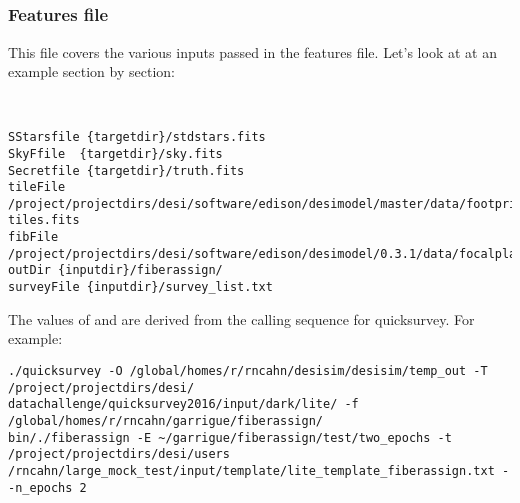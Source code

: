 \documentclass[12pt]{article}
\begin{document}
\subsection{}
\subsubsection{Features file}
This file covers the various inputs passed in the features file. 
Let's look at at an example section by section:

\begin{verbatim}


SStarsfile {targetdir}/stdstars.fits
SkyFfile  {targetdir}/sky.fits
Secretfile {targetdir}/truth.fits
tileFile /project/projectdirs/desi/software/edison/desimodel/master/data/footprint/desi-tiles.fits
fibFile /project/projectdirs/desi/software/edison/desimodel/0.3.1/data/focalplane/fiberpos.txt
outDir {inputdir}/fiberassign/
surveyFile {inputdir}/survey_list.txt
\end{verbatim}

The values of  and  are derived from the calling sequence for quicksurvey.
For example:
\begin{verbatim}
./quicksurvey -O /global/homes/r/rncahn/desisim/desisim/temp_out -T /project/projectdirs/desi/
datachallenge/quicksurvey2016/input/dark/lite/ -f /global/homes/r/rncahn/garrigue/fiberassign/
bin/./fiberassign -E ~/garrigue/fiberassign/test/two_epochs -t /project/projectdirs/desi/users
/rncahn/large_mock_test/input/template/lite_template_fiberassign.txt --n_epochs 2
\end{verbatim}
\end{document}
